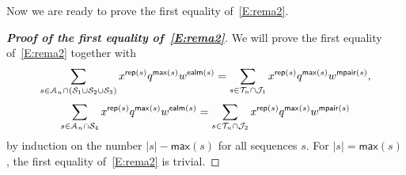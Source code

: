 \documentclass[12pt]{amsart}
\theoremstyle{plain}
\theoremstyle{definition}
\theoremstyle{example}
\theoremstyle{remark}
\numberwithin{equation}{section}
\numberwithin{figure}{section}
\def\max{\mathsf{max}}
\def\rep{\mathsf{rep}}
\def\ealm{\mathsf{ealm}}
\def\mpair{\mathsf{mpair}}
\def\A{\mathcal{A}}
\begin{document}
Now we are ready to prove the first equality of~\eqref{E:rema2}.

\begin{proof}[{\bf Proof of the first equality of~\eqref{E:rema2}}]
 We will prove the first equality of~\eqref{E:rema2} together with
\begin{align}\label{E:21}
\sum_{s\in\A_n\cap(\CMcal{S}_1\cup\CMcal{S}_2\cup\CMcal{S}_3)}
x^{\rep(s)}q^{\max(s)}w^{\ealm(s)}
=\sum_{s\in\CMcal{T}_n\cap\CMcal{J}_1}
x^{\rep(s)}q^{\max(s)}w^{\mpair(s)},
\end{align}
\begin{align}
\label{E:22}\sum_{s\in\A_n\cap\CMcal{S}_4}
x^{\rep(s)}q^{\max(s)}w^{\ealm(s)}
=\sum_{s\in\CMcal{T}_n\cap\CMcal{J}_2}
x^{\rep(s)}q^{\max(s)}w^{\mpair(s)}
\end{align}
by induction on the number $|s|-\max(s)$ for all sequences $s$. For $|s|=\max(s)$, the first equality of~\eqref{E:rema2} is trivial.


\end{proof}
\end{document}
